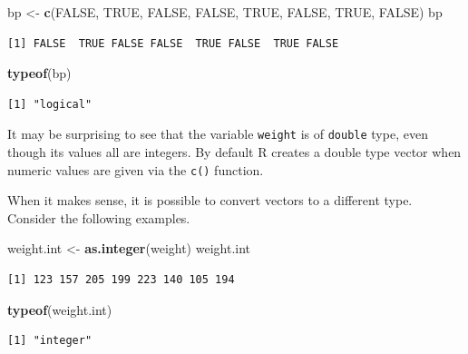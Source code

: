 \documentclass[
]{krantz}
\makeatletter
\newenvironment{Shaded}{\begin{snugshade}}{\end{snugshade}}
\newcommand{\KeywordTok}[1]{\textcolor[rgb]{0.27,0.27,0.27}{\textbf{#1}}}
\newcommand{\NormalTok}[1]{#1}
\newcommand{\OtherTok}[1]{\textcolor[rgb]{0.37,0.37,0.37}{#1}}
\newcommand{\StringTok}[1]{\textcolor[rgb]{0.5,0.5,0.5}{#1}}
\newenvironment{kframe}{%
\medskip{}
\setlength{\fboxsep}{.8em}
 \def\at@end@of@kframe{}%
 \ifinner\ifhmode%
  \def\at@end@of@kframe{\end{minipage}}%
  \begin{minipage}{\columnwidth}%
 \fi\fi%
 \def\FrameCommand##1{\hskip\@totalleftmargin \hskip-\fboxsep
 \colorbox{shadecolor}{##1}\hskip-\fboxsep
     \hskip-\linewidth \hskip-\@totalleftmargin \hskip\columnwidth}%
 \MakeFramed {\advance\hsize-\width
   \@totalleftmargin\z@ \linewidth\hsize
   \@setminipage}}%
 {\par\unskip\endMakeFramed%
 \at@end@of@kframe}
\renewenvironment{Shaded}{\begin{kframe}}{\end{kframe}}
\makeatother
\begin{document}
\begin{Shaded}
\begin{Highlighting}[]
\NormalTok{bp \textless{}{-}}\StringTok{ }\KeywordTok{c}\NormalTok{(}\OtherTok{FALSE}\NormalTok{, }\OtherTok{TRUE}\NormalTok{, }\OtherTok{FALSE}\NormalTok{, }\OtherTok{FALSE}\NormalTok{, }\OtherTok{TRUE}\NormalTok{, }\OtherTok{FALSE}\NormalTok{, }\OtherTok{TRUE}\NormalTok{, }\OtherTok{FALSE}\NormalTok{)}
\NormalTok{bp}
\end{Highlighting}
\end{Shaded}

\begin{verbatim}
[1] FALSE  TRUE FALSE FALSE  TRUE FALSE  TRUE FALSE
\end{verbatim}

\begin{Shaded}
\begin{Highlighting}[]
\KeywordTok{typeof}\NormalTok{(bp)}
\end{Highlighting}
\end{Shaded}

\begin{verbatim}
[1] "logical"
\end{verbatim}

It may be surprising to see that the variable \texttt{weight} is of \texttt{double} type, even though its values all are integers. By default R creates a double type vector when numeric values are given via the \texttt{c()} function.

When it makes sense, it is possible to convert vectors to a different type. Consider the following examples.

\begin{Shaded}
\begin{Highlighting}[]
\NormalTok{weight.int \textless{}{-}}\StringTok{ }\KeywordTok{as.integer}\NormalTok{(weight)}
\NormalTok{weight.int}
\end{Highlighting}
\end{Shaded}

\begin{verbatim}
[1] 123 157 205 199 223 140 105 194
\end{verbatim}

\begin{Shaded}
\begin{Highlighting}[]
\KeywordTok{typeof}\NormalTok{(weight.int)}
\end{Highlighting}
\end{Shaded}

\begin{verbatim}
[1] "integer"
\end{verbatim}
\end{document}
